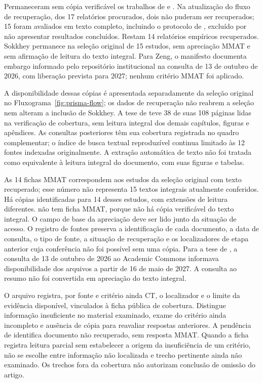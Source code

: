 \begin{apendicesenv}
Permaneceram sem cópia verificável os trabalhos de  e . Na atualização do fluxo de recuperação, dos 17 relatórios procurados, dois não puderam ser recuperados; 15 foram avaliados em texto completo, incluindo o protocolo de , excluído por não apresentar resultados concluídos. Restam 14 relatórios empíricos recuperados. Sokkhey permanece na seleção original de 15 estudos, sem apreciação MMAT e sem afirmação de leitura do texto integral. Para Zeng, o manifesto documenta embargo informado pelo repositório institucional na consulta de 13 de outubro de 2026, com liberação prevista para 2027; nenhum critério MMAT foi aplicado.

A disponibilidade dessas cópias é apresentada separadamente da seleção original no Fluxograma~\ref{fig:prisma-flow}; os dados de recuperação não reabrem a seleção nem alteram a inclusão de Sokkhey. A tese de  teve 38 de suas 108 páginas lidas na verificação de cobertura, sem leitura integral dos demais capítulos, figuras e apêndices. As consultas posteriores têm sua cobertura registrada no quadro complementar; o índice de busca textual reproduzível continua limitado às 12 fontes indexadas originalmente. A extração automática de texto não foi tratada como equivalente à leitura integral do documento, com suas figuras e tabelas.

As 14 fichas MMAT correspondem aos estudos da seleção original com texto recuperado; esse número não representa 15 textos integrais atualmente conferidos. Há cópias identificadas para 14 desses estudos, com extensões de leitura diferentes.  não tem ficha MMAT, porque não há cópia verificável do texto integral. O campo de base da apreciação deve ser lido junto da situação de acesso. O registro de fontes preserva a identificação de cada documento, a data de consulta, o tipo de fonte, a situação de recuperação e os localizadores de etapa anterior cuja conferência não foi possível sem uma cópia. Para a tese de , a consulta de 13 de outubro de 2026 ao Academic Commons informava disponibilidade dos arquivos a partir de 16 de maio de 2027. A consulta ao resumo não foi convertida em apreciação do texto integral.

O arquivo  registra, por fonte e critério ainda CT, o localizador e o limite da evidência disponível, vinculados à ficha pública de cobertura. Distingue informação insuficiente no material examinado, exame do critério ainda incompleto e ausência de cópia para reavaliar respostas anteriores. A pendência de  identifica documento não recuperado, sem resposta MMAT. Quando a ficha registra leitura parcial sem estabelecer a origem da insuficiência de um critério, não se escolhe entre informação não localizada e trecho pertinente ainda não examinado. Os trechos fora da cobertura não autorizam conclusão de omissão do artigo.


\end{apendicesenv}
